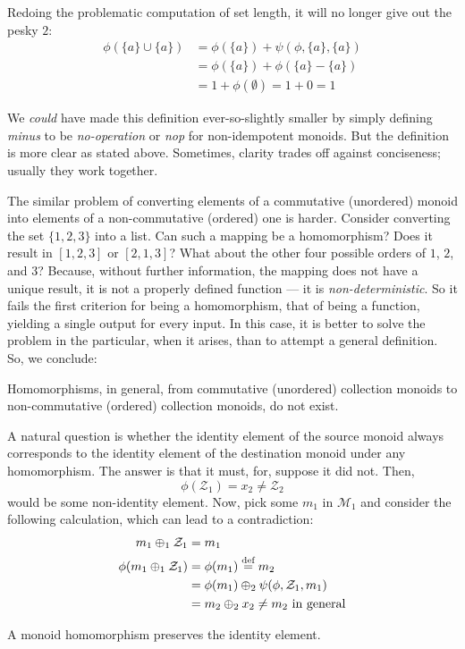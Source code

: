 Redoing the problematic computation of set length, it will no longer give out the pesky $2$:
\begin{align*}
  \phi\left(\{a\}\cup\{a\}\right)
  &= \phi\left(\{a\}\right)+\psi\left(\phi,\{a\},\{a\}\right)\\
  &= \phi\left(\{a\}\right)+\phi\left(\{a\}-\{a\}\right) \\
  &= 1 + \phi\left(\emptyset\right)=1+0=1
\end{align*}


We \emph{could} have made this definition ever-so-slightly smaller by simply defining \emph{minus} to be \emph{no-operation} or \emph{nop} for non-idempotent monoids. But the definition is more clear as stated above. Sometimes, clarity trades off against conciseness; usually they work together.


The similar problem of converting elements of a commutative (unordered) monoid into elements of a non-commutative (ordered) one is harder. Consider converting the set $\{1,2,3\}$ into a list. Can such a mapping be a homomorphism? Does it result in $[1,2,3]$ or $[2,1,3]$? What about the other four possible orders of $1$, $2$, and $3$? Because, without further information, the mapping does not have a unique result, it is not a properly defined function --- it is \emph{non-deterministic}. So it fails the first criterion for being a homomorphism, that of being a function, yielding a single output for every input. In this case, it is better to solve the problem in the particular, when it arises, than to attempt a general definition. So, we conclude:


\begin{observation}
Homomorphisms, in general, from commutative (unordered) collection monoids to non-commutative (ordered) collection monoids, do not exist.
\end{observation}


A natural question is whether the identity element of the source monoid always corresponds to the identity element of the destination monoid under any homomorphism. The answer is that it must, for, suppose it did not. Then,
\[
  \phi(\mathcal{Z}_{1}) = x_2 \neq \mathcal{Z}_{2}
\]
would be some non-identity element. Now, pick some $m_1$ in $\mathcal{M}_1$ and consider the following calculation, which can lead to a contradiction:
\begin{align*}
  m_1 \oplus_1 \mathcal{Z}_1       &= m_1                   \\
  \phi(m_1 \oplus_1 \mathcal{Z}_1) &= \phi(m_1) \overset{\text{def}}{=} m_2  \\
  {} &= \phi(m_1) \oplus_2 \psi(\phi,\mathcal{Z}_1,m_1) \\
  {} &= m_2 \oplus_2 x_2 \neq m_2 \text{ in general}
\end{align*}
\begin{lemma}
  A monoid homomorphism preserves the identity element.
\end{lemma}


